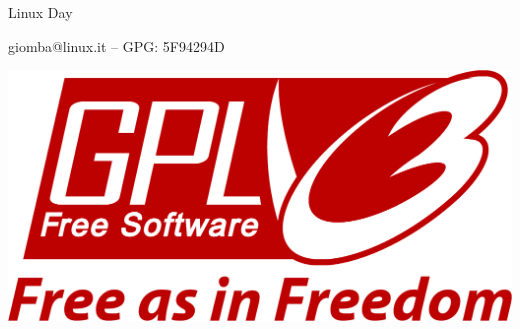\documentclass{beamer}
\begin{document}
\begin{frame}
\begin{block}{Linux Day}
\begin{minipage}{.65\linewidth}
    giomba@linux.it -- GPG: 5F94294D
    \end{minipage}
    \begin{minipage}{.15\linewidth}
      \includegraphics[width=1\linewidth]{img/gpl3.pdf}
    \end{minipage}
    \end{block}



\end{frame}
\end{document}

